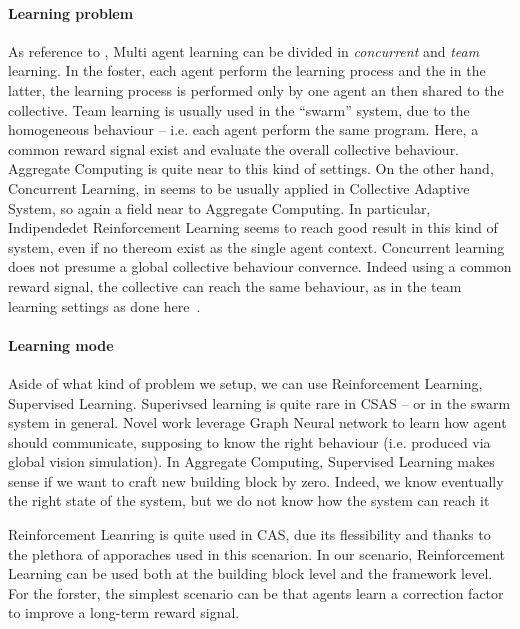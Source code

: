 \documentclass[
  twocolumn,
]{ceurart}
\begin{document}
\paragraph{Learning problem} As reference to \cite{mas-anc-cooperation}, Multi agent learning can be
 divided in \textit{concurrent} and \textit{team} learning. In the foster, each agent perform the 
 learning process and the in the latter, the learning process is performed only by one agent an then 
 shared to the collective.
 Team learning is usually used in the ``swarm'' system, due to the homogeneous behaviour -- i.e. each
 agent perform the same program. Here, a common reward signal exist and evaluate the overall collective behaviour.
 Aggregate Computing is quite near to this kind of settings.
 On the other hand, Concurrent Learning, in \cite{csas-and-marl} seems to be usually applied in Collective
 Adaptive System, so again a field near to Aggregate Computing. In particular, Indipendedet Reinforcement Learning
 seems to reach good result in this kind of system, even if no thereom exist as the single agent context.
 Concurrent learning does not presume a global collective behaviour convernce. Indeed using a common reward signal,
 the collective can reach the same behaviour, as in the team learning settings as done here~\cite{iima2008swarm}.
\paragraph{Learning mode}
Aside of what kind of problem we setup, we can use Reinforcement Learning, Supervised Learning.
 Superivsed learning is quite rare in CSAS -- or in the swarm system in general. Novel work leverage Graph Neural network
 to learn how agent should communicate, supposing to know the right behaviour (i.e. produced via global vision simulation).
 In Aggregate Computing, Supervised Learning makes sense if we want to craft new building block by zero. 
 Indeed, we know eventually the right state of the system, but we do not know how the system can reach it

 Reinforcement Leanring is quite used in CAS, 
 due its flessibility and thanks to the plethora of apporaches used in this scenarion.
 In our scenario, Reinforcement Learning can be used both at the building block level and the framework level.
 For the forster, the simplest scenario can be that agents learn a correction factor to improve a long-term
 reward signal.
 
\end{document}
